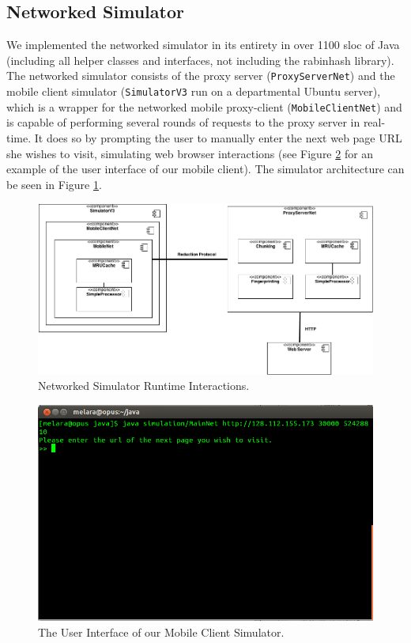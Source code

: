 \subsection{Networked Simulator}
\label{sec:netsim}
We implemented the networked simulator in its entirety in over 1100 sloc of Java (including all helper classes and interfaces, not including the rabinhash library). The networked simulator consists of the proxy server (\texttt{ProxyServerNet}) and the mobile client simulator (\texttt{SimulatorV3} run on a departmental Ubuntu server), which is a wrapper for the networked mobile proxy-client (\texttt{MobileClientNet}) and is capable of performing several rounds of requests to the proxy server in real-time. It does so by prompting the user to manually enter the next web page URL she wishes to visit, simulating web browser interactions (see Figure \ref{fig:mobsim_ui} for an example of the user interface of our mobile client). The simulator architecture can be seen in Figure \ref{fig:netsim_arch}. 

\begin{figure}[ht] 
\centering \includegraphics[scale=0.40]{images/component_diagram.png}
\caption{Networked Simulator Runtime Interactions.}
\label{fig:netsim_arch}
\end{figure}

\begin{figure}[h] 
\centering \includegraphics[scale=0.40]{images/mobilesim_ui.png}
\caption{The User Interface of our Mobile Client Simulator.}
\label{fig:mobsim_ui}
\end{figure}


